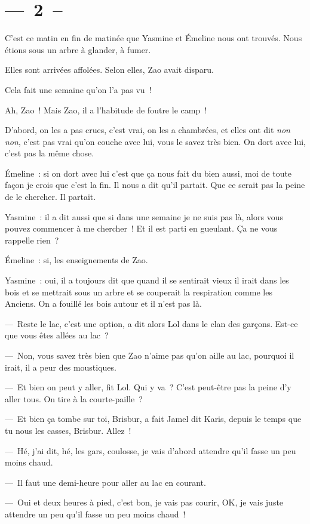 \documentclass[french,twoside]{book} %
\begin{document}
\section[{— 2 –}]{— 2 –}\renewcommand{\leftmark}{— 2 –}

\noindent C’est ce matin en fin de matinée que Yasmine et Émeline nous ont trouvés. Nous étions sous un arbre à glander, à fumer.\par
Elles sont arrivées affolées. Selon elles, Zao avait disparu.\par
Cela fait une semaine qu’on l’a pas vu !\par
Ah, Zao ! Mais Zao, il a l’habitude de foutre le camp !\par
D’abord, on les a pas crues, c’est vrai, on les a chambrées, et elles ont dit \emph{non non}, c’est pas vrai qu’on couche avec lui, vous le savez très bien. On dort avec lui, c’est pas la même chose.\par
Émeline : si on dort avec lui c’est que ça nous fait du bien aussi, moi de toute façon je crois que c’est la fin. Il nous a dit qu’il partait. Que ce serait pas la peine de le chercher. Il partait.\par
Yasmine : il a dit aussi que si dans une semaine je ne suis pas là, alors vous pouvez commencer à me chercher ! Et il est parti en gueulant. Ça ne vous rappelle rien ?\par
Émeline : si, les enseignements de Zao.\par
Yasmine : oui, il a toujours dit que quand il se sentirait vieux il irait dans les bois et se mettrait sous un arbre et se couperait la respiration comme les Anciens. On a fouillé les bois autour et il n’est pas là.\par
— Reste le lac, c’est une option, a dit alors Lol dans le clan des garçons. Est-ce que vous êtes allées au lac ?\par
— Non, vous savez très bien que Zao n’aime pas qu’on aille au lac, pourquoi il irait, il a peur des moustiques.\par
— Et bien on peut y aller, fit Lol. Qui y va ? C’est peut-être pas la peine d’y aller tous. On tire à la courte-paille ?\par
— Et bien ça tombe sur toi, Brisbur, a fait Jamel dit Karis, depuis le temps que tu nous les casses, Brisbur. Allez !\par
— Hé, j’ai dit, hé, les gars, coulosse, je vais d’abord attendre qu’il fasse un peu moins chaud.\par
— Il faut une demi-heure pour aller au lac en courant.\par
— Oui et deux heures à pied, c’est bon, je vais pas courir, OK, je vais juste attendre un peu qu’il fasse un peu moins chaud !
\end{document}
